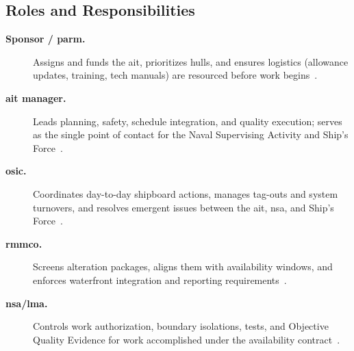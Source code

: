 \documentclass[../main.tex]{subfiles}
\begin{document}
\subsection{Roles and Responsibilities}
\begin{description}
  \item[\textbf{Sponsor / \ac{parm}.}] Assigns and funds the \ac{ait}, prioritizes hulls, and ensures logistics (allowance updates, training, tech manuals) are resourced before work begins~\autocite{SL720-AA-MAN-030}.
  \item[\textbf{\ac{ait} manager.}] Leads planning, safety, schedule integration, and quality execution; serves as the single point of contact for the Naval Supervising Activity and Ship's Force~\autocite{TS9090-310}.
  \item[\textbf{\ac{osic}.}] Coordinates day-to-day shipboard actions, manages tag-outs and system turnovers, and resolves emergent issues between the \ac{ait}, \ac{nsa}, and Ship's Force~\autocite{edo-4-1-4-ait-fundamentals-2025}.
  \item[\textbf{\ac{rmmco}.}] Screens alteration packages, aligns them with availability windows, and enforces waterfront integration and reporting requirements~\autocite{TS9090-310}.
  \item[\textbf{\ac{nsa}/\ac{lma}.}] Controls work authorization, boundary isolations, tests, and Objective Quality Evidence for work accomplished under the availability contract~\autocite{COMFLTFORCOMINST4790-3}.
\end{description}
\end{document}
